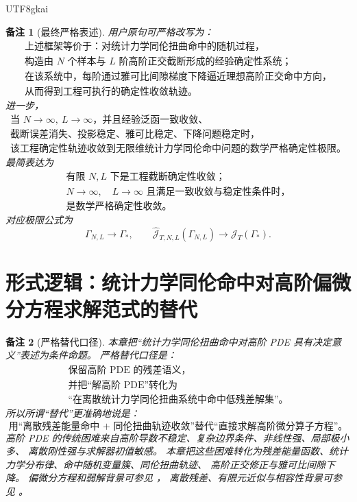 \documentclass[12pt]{article}
\newtheorem{remark}{备注}[section]
\begin{document}
\begin{CJK*}{UTF8}{gkai}
\begin{remark}[最终严格表述]
用户原句可严格改写为：
\[
  \boxed{
  \begin{gathered}
  \text{上述框架等价于：对统计力学同伦扭曲命中的随机过程，}\\
  \text{构造由 }N\text{ 个样本与 }L\text{ 阶高阶正交截断形成的经验确定性系统；}\\
  \text{在该系统中，每阶通过雅可比间隙梯度下降逼近理想高阶正交命中方向，}\\
  \text{从而得到工程可执行的确定性收敛轨迹。}
  \end{gathered}
  }
\]
进一步，
\[
  \boxed{
  \begin{gathered}
  \text{当 }N\to\infty,\ L\to\infty\text{，并且经验泛函一致收敛、}\\
  \text{截断误差消失、投影稳定、雅可比稳定、下降问题稳定时，}\\
  \text{该工程确定性轨迹收敛到无限维统计力学同伦命中问题的数学严格确定性极限。}
  \end{gathered}
  }
\]
最简表达为
\[
  \boxed{
  \begin{gathered}
  \text{有限 }N,L\text{ 下是工程截断确定性收敛；}\\
  N\to\infty,\quad L\to\infty
  \text{ 且满足一致收敛与稳定性条件时，}\\
  \text{是数学严格确定性收敛。}
  \end{gathered}
  }
\]
对应极限公式为
\[
  \boxed{
  \Gamma_{N,L}\to\Gamma_*,
  \qquad
  \widehat{\mathcal J}_{T,N,L}(\Gamma_{N,L})
  \to
  \mathcal J_T(\Gamma_*).
  }
\]
\end{remark}

\clearpage

\section{形式逻辑：统计力学同伦命中对高阶偏微分方程求解范式的替代}
\label{sec:tex55-pde-paradigm-replacement}

\begin{remark}[严格替代口径]
本章把“统计力学同伦扭曲命中对高阶 PDE 具有决定意义”表述为条件命题。
严格替代口径是：
\[
  \boxed{
  \begin{gathered}
  \text{保留高阶 PDE 的残差语义，}\\
  \text{并把“解高阶 PDE”转化为}\\
  \text{“在离散统计力学同伦扭曲系统中命中低残差解集”。}
  \end{gathered}
  }
\]
所以所谓“替代”更准确地说是：
\[
  \boxed{
  \text{用“离散残差能量命中 + 同伦扭曲轨迹收敛”替代“直接求解高阶微分算子方程”。}
  }
\]
高阶 PDE 的传统困难来自高阶导数不稳定、复杂边界条件、非线性强、局部极小多、
离散刚性强与求解器初值敏感。
本章把这些困难转化为残差能量函数、统计力学分布律、命中随机变量簇、同伦扭曲轨迹、
高阶正交修正与雅可比间隙下降。
偏微分方程和弱解背景可参见 \cite{Evans2010PDE}，
离散残差、有限元近似与相容性背景可参见 \cite{BrennerScott2008FEM}。
\end{remark}


\end{CJK*}
\end{document}
